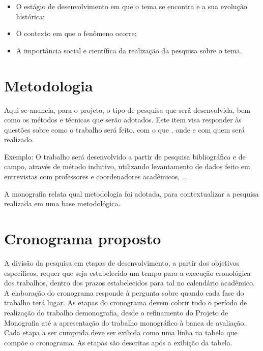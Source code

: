\begin{itemize}
    \item O estágio de desenvolvimento em que o tema se encontra e a sua
          evolução histórica;
    \item O contexto em que o fenômeno ocorre;
    \item A importância social e científica da realização da pesquisa sobre o
          tema.
\end{itemize}

\section{Metodologia}

Aqui se anuncia, para o projeto, o tipo de pesquisa que será desenvolvida, bem
como os métodos e técnicas que serão adotados. Este item visa responder às
questões sobre como o trabalho será feito, com o que , onde e com quem será
realizado.

Exemplo: O trabalho será desenvolvido a partir de pesquisa bibliográfica e de
campo, através de método indutivo, utilizando levantamento de dados feito em
entrevistas com professores e coordenadores acadêmicos, ...

A monografia relata qual metodologia foi adotada, para contextualizar a pesquisa
realizada em uma base metodológica.


\section{Cronograma proposto}

A divisão da pesquisa em etapas de desenvolvimento, a partir dos objetivos
específicos, requer que seja estabelecido um tempo para a execução cronológica
dos trabalhos, dentro dos prazos estabelecidos para tal no calendário acadêmico.
A elaboração do cronograma responde à pergunta sobre quando cada fase do
trabalho terá lugar. As etapas do cronograma devem cobrir todo o período de
realização do trabalho demonografia, desde o refinamento do Projeto de
Monografia até a apresentação do trabalho monográfico à banca de avaliação. Cada
etapa a ser cumprida deve ser exibida como uma linha na tabela que compõe o
cronograma. As etapas são descritas após a exibição da tabela.

